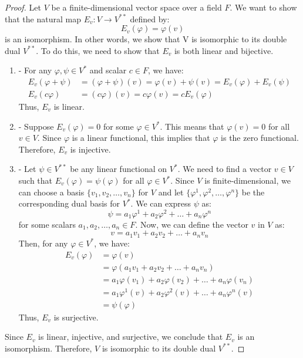 \documentclass[openany]{book}
\begin{document}
\begin{proof}
Let $V$ be a finite-dimensional vector space over a field $F$. We want to show that the natural map $E_v: V \to V^{**}$ defined by:
$$E_v(\varphi) = \varphi(v)$$
is an isomorphism. In other words, we show that V is isomorphic to its double dual $V^{**}$. To do this, we need to show that $E_v$ is both linear and bijective.
\begin{enumerate}
    \item {} - For any $\varphi, \psi \in V^*$ and scalar $c \in F$, we have:
    \[\begin{aligned}
    E_v(\varphi + \psi) &= (\varphi + \psi)(v) = \varphi(v) + \psi(v) = E_v(\varphi) + E_v(\psi) \\
    E_v(c\varphi) &= (c\varphi)(v) = c\varphi(v) = cE_v(\varphi)
    \end{aligned}\]
    Thus, $E_v$ is linear.
    
    \item {} - Suppose $E_v(\varphi) = 0$ for some $\varphi \in V^*$. This means that $\varphi(v) = 0$ for all $v \in V$. Since $\varphi$ is a linear functional, this implies that $\varphi$ is the zero functional. Therefore, $E_v$ is injective.
    
    \item {} - Let $\psi \in V^{**}$ be any linear functional on $V^*$. We need to find a vector $v \in V$ such that $E_v(\varphi) = \psi(\varphi)$ for all $\varphi \in V^*$. Since $V$ is finite-dimensional, we can choose a basis $\{v_1, v_2, \ldots, v_n\}$ for $V$ and let $\{\varphi^1, \varphi^2, \ldots, \varphi^n\}$ be the corresponding dual basis for $V^*$. We can express $\psi$ as:
    $$\psi = a_1 \varphi^1 + a_2 \varphi^2 + \ldots + a_n \varphi^n$$
    for some scalars $a_1, a_2, \ldots, a_n \in F$. Now, we can define the vector $v$ in $V$ as:
    $$v = a_1 v_1 + a_2 v_2 + \ldots + a_n v_n$$
    Then, for any $\varphi \in V^*$, we have:
    \[\begin{aligned}
    E_v(\varphi) &= \varphi(v) \\
    &= \varphi(a_1 v_1 + a_2 v_2 + \ldots + a_n v_n) \\
    &= a_1 \varphi(v_1) + a_2 \varphi(v_2) + \ldots + a_n \varphi(v_n) \\
    &= a_1 \varphi^1(v) + a_2 \varphi^2(v) + \ldots + a_n \varphi^n(v) \\
    &= \psi(\varphi)
    \end{aligned}\]
    Thus, $E_v$ is surjective.
\end{enumerate}
Since $E_v$ is linear, injective, and surjective, we conclude that $E_v$ is an isomorphism. Therefore, $V$ is isomorphic to its double dual $V^{**}$.
\end{proof}
\end{document}
